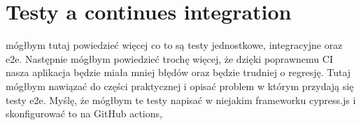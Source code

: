 \section{Testy a continues integration}
mógłbym tutaj powiedzieć więcej co to są testy jednostkowe, integracyjne oraz e2e. Następnie mógłbym powiedzieć trochę więcej, że dzięki poprawnemu CI nasza aplikacja będzie miała mniej błędów oraz będzie trudniej o regresję.
Tutaj mógłbym nawiązać do części praktycznej i opisać problem w którym przydają się testy e2e. Myślę, że mógłbym te testy napisać w niejakim frameworku cypress.js i skonfigurować to na GitHub actions,